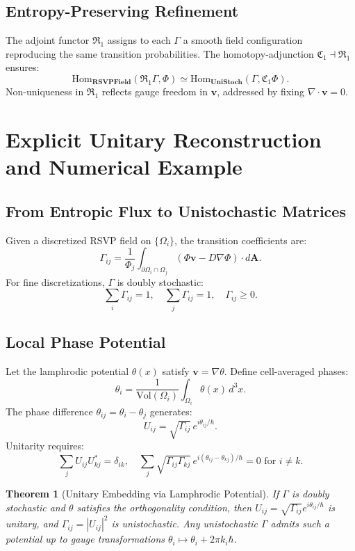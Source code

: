 \documentclass[12pt]{article}
\newtheorem{theorem}{Theorem}
\begin{document}
\subsection{Entropy-Preserving Refinement}

The adjoint functor \(\mathfrak{R}_1\) assigns to each \(\Gamma\) a smooth field configuration reproducing the same transition probabilities. The homotopy-adjunction \(\mathfrak{C}_1 \dashv \mathfrak{R}_1\) ensures:
\[
\mathrm{Hom}_{\mathbf{RSVPField}}(\mathfrak{R}_1 \Gamma, \Phi) \simeq \mathrm{Hom}_{\mathbf{UniStoch}}(\Gamma, \mathfrak{C}_1 \Phi).
\]
Non-uniqueness in \(\mathfrak{R}_1\) reflects gauge freedom in \(\mathbf{v}\), addressed by fixing \(\nabla \cdot \mathbf{v} = 0\).

\section{Explicit Unitary Reconstruction and Numerical Example}

\subsection{From Entropic Flux to Unistochastic Matrices}

Given a discretized RSVP field on \(\{\Omega_i\}\), the transition coefficients are:
\[
\Gamma_{ij} = \frac{1}{\Phi_j} \int_{\partial \Omega_i \cap \Omega_j} (\Phi \mathbf{v} - D \nabla \Phi) \cdot d\mathbf{A}.
\]
For fine discretizations, \(\Gamma\) is doubly stochastic:
\[
\sum_i \Gamma_{ij} = 1, \quad \sum_j \Gamma_{ij} = 1, \quad \Gamma_{ij} \geq 0.
\]

\subsection{Local Phase Potential}

Let the lamphrodic potential \(\theta(x)\) satisfy \(\mathbf{v} = \nabla \theta\). Define cell-averaged phases:
\[
\theta_i = \frac{1}{\mathrm{Vol}(\Omega_i)} \int_{\Omega_i} \theta(x) \, d^3x.
\]
The phase difference \(\theta_{ij} = \theta_i - \theta_j\) generates:
\[
U_{ij} = \sqrt{\Gamma_{ij}} \, e^{i \theta_{ij} / \hbar}.
\]
Unitarity requires:
\[
\sum_j U_{ij} U_{kj}^* = \delta_{ik}, \quad \sum_j \sqrt{\Gamma_{ij} \Gamma_{kj}} \, e^{i (\theta_{ij} - \theta_{kj}) / \hbar} = 0 \text{ for } i \neq k.
\]

\begin{theorem}[Unitary Embedding via Lamphrodic Potential]
\label{thm:unitaryembedding}
If \(\Gamma\) is doubly stochastic and \(\theta\) satisfies the orthogonality condition, then \(U_{ij} = \sqrt{\Gamma_{ij}} e^{i \theta_{ij} / \hbar}\) is unitary, and \(\Gamma_{ij} = |U_{ij}|^2\) is unistochastic. Any unistochastic \(\Gamma\) admits such a potential up to gauge transformations \(\theta_i \mapsto \theta_i + 2\pi k_i \hbar\).
\end{theorem}
\end{document}
